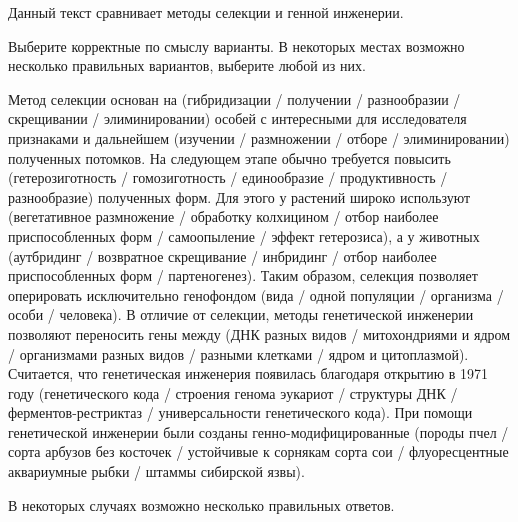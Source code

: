 
Данный текст сравнивает методы селекции и генной инженерии.

Выберите корректные по смыслу варианты. В некоторых местах возможно несколько правильных вариантов, выберите любой из них.

Метод селекции основан на (гибридизации / получении / разнообразии / скрещивании / элиминировании) 
особей с интересными для исследователя признаками и дальнейшем (изучении / размножении / отборе / элиминировании) 
полученных потомков. На следующем этапе обычно требуется повысить (гетерозиготность / гомозиготность / единообразие / продуктивность / разнообразие) 
полученных форм. Для этого у растений широко используют (вегетативное размножение / обработку колхицином / отбор наиболее приспособленных форм / самоопыление / эффект гетерозиса), 
а у животных (аутбридинг / возвратное скрещивание / инбридинг / отбор наиболее приспособленных форм / партеногенез). 
Таким образом, селекция позволяет оперировать исключительно генофондом (вида / одной популяции / организма / особи / человека). 
В отличие от селекции, методы генетической инженерии позволяют переносить гены между 
(ДНК разных видов / митохондриями и ядром / организмами разных видов / разными клетками / ядром и цитоплазмой). 
Считается, что генетическая инженерия появилась благодаря открытию в 1971 году 
(генетического кода / строения генома эукариот / структуры ДНК / ферментов-рестриктаз / универсальности генетического кода). 
При помощи генетической инженерии были созданы генно-модифицированные (породы пчел / сорта арбузов без косточек / устойчивые к сорнякам сорта сои / флуоресцентные аквариумные рыбки / штаммы сибирской язвы).

\explanationSection

В некоторых случаях возможно несколько правильных ответов.

